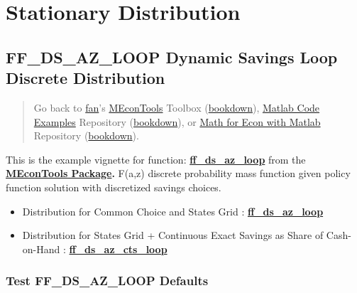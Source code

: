 \documentclass[
]{book}
\begin{document}
\hypertarget{stationary-distribution}{%
\chapter{Stationary Distribution}\label{stationary-distribution}}

\hypertarget{ff_ds_az_loop-dynamic-savings-loop-discrete-distribution}{%
\section{FF\_DS\_AZ\_LOOP Dynamic Savings Loop Discrete Distribution}\label{ff_ds_az_loop-dynamic-savings-loop-discrete-distribution}}

\begin{quote}
Go back to \href{http://fanwangecon.github.io/}{fan}'s \href{https://fanwangecon.github.io/MEconTools/}{MEconTools} Toolbox (\href{https://fanwangecon.github.io/MEconTools/bookdown}{bookdown}), \href{https://fanwangecon.github.io/M4Econ/}{Matlab Code Examples} Repository (\href{https://fanwangecon.github.io/M4Econ/bookdown}{bookdown}), or \href{https://fanwangecon.github.io/Math4Econ/}{Math for Econ with Matlab} Repository (\href{https://fanwangecon.github.io/Math4Econ/bookdown}{bookdown}).
\end{quote}

This is the example vignette for function:
\href{https://github.com/FanWangEcon/MEconTools/blob/master/MEconTools/vfi/ff_ds_az_loop.m}{\textbf{ff\_ds\_az\_loop}}
from the \href{https://fanwangecon.github.io/MEconTools/}{\textbf{MEconTools
Package}}\textbf{.} F(a,z)
discrete probability mass function given policy function solution with
discretized savings choices.

\begin{itemize}
\item
  Distribution for Common Choice and States Grid :
  \href{https://github.com/FanWangEcon/MEconTools/blob/master/MEconTools/vfi/ff_ds_az_loop.m}{\textbf{ff\_ds\_az\_loop}}
\item
  Distribution for States Grid + Continuous Exact Savings as Share of
  Cash-on-Hand :
  \href{https://github.com/FanWangEcon/MEconTools/blob/master/MEconTools/vfi/ff_ds_az_cts_loop.m}{\textbf{ff\_ds\_az\_cts\_loop}}
\end{itemize}

\hypertarget{test-ff_ds_az_loop-defaults}{%
\subsection{Test FF\_DS\_AZ\_LOOP Defaults}\label{test-ff_ds_az_loop-defaults}}
\end{document}
